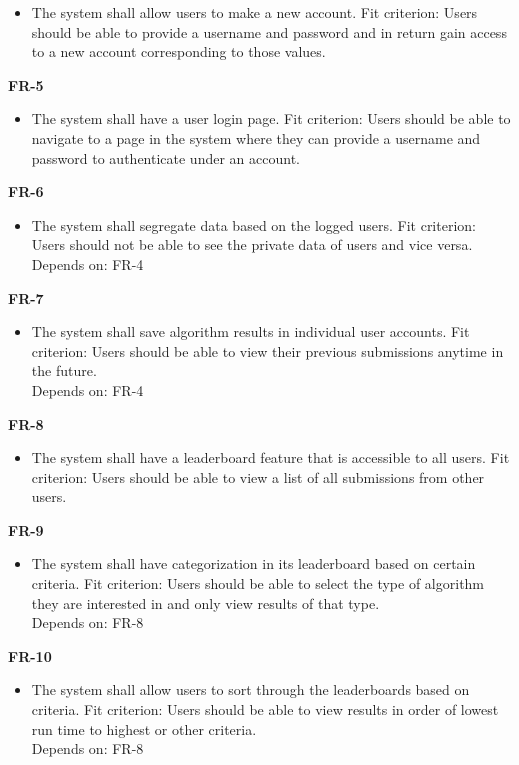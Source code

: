 \documentclass[12pt]{article}
\begin{document}
\begin{itemize}
    \item The system shall allow users to make a new account. \hfill \break
    Fit criterion: Users should be able to provide a username and password and in return gain access to a new account corresponding to those values.
\end{itemize}
\textbf{FR-5}
\begin{itemize}
    \item The system shall have a user login page. \hfill \break
    Fit criterion: Users should be able to navigate to a page in the system where they can provide a username and password to authenticate under an account.
\end{itemize}
\textbf{FR-6}
\begin{itemize}
    \item The system shall segregate data based on the logged users. \hfill \break
    Fit criterion: Users should not be able to see the private data of users and vice versa. \\
    Depends on: FR-4
\end{itemize}
\textbf{FR-7}
\begin{itemize}
    \item The system shall save algorithm results in individual user accounts. \hfill \break
    Fit criterion: Users should be able to view their previous submissions anytime in the future. \\
    Depends on: FR-4
\end{itemize}
\textbf{FR-8}
\begin{itemize}
    \item The system shall have a leaderboard feature that is accessible to all users. \hfill \break
    Fit criterion: Users should be able to view a list of all submissions from other users.
\end{itemize}
\textbf{FR-9}
\begin{itemize}
    \item The system shall have categorization in its leaderboard based on certain criteria. \hfill \break
    Fit criterion: Users should be able to select the type of algorithm they are interested in and only view results of that type. \\
    Depends on: FR-8
\end{itemize}
\textbf{FR-10}
\begin{itemize}
    \item The system shall allow users to sort through the leaderboards based on criteria. \hfill \break
    Fit criterion: Users should be able to view results in order of lowest run time to highest or other criteria. \\
    Depends on: FR-8
\end{itemize}
\end{document}

